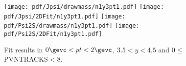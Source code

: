 \begin{figure}[H]
\begin{center}
\texttt{[image: pdf/Jpsi/drawmass/n1y3pt1.pdf]}
\texttt{[image: pdf/Jpsi/2DFit/n1y3pt1.pdf]}
\vspace*{-0.5cm}
\texttt{[image: pdf/Psi2S/drawmass/n1y3pt1.pdf]}
\texttt{[image: pdf/Psi2S/2DFit/n1y3pt1.pdf]}
\vspace*{-0.5cm}
\end{center}
\caption{Fit results in $0\gevc<pt<2\gevc$, $3.5<y<4.5$ and 0$\leq$PVNTRACKS$<$8.}
\label{Fitn1y3pt1}
\end{figure}
